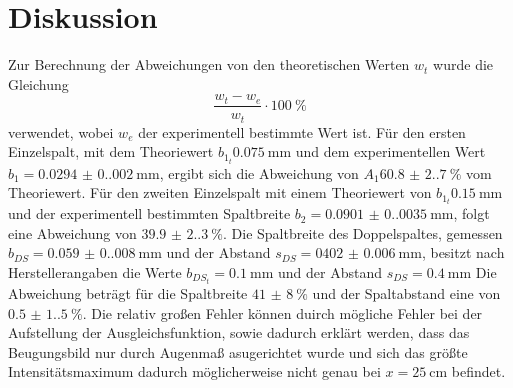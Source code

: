 \section{Diskussion}

Zur Berechnung der Abweichungen von den theoretischen Werten $w_t$ wurde die Gleichung 
\begin{equation}
    \frac{w_t-w_e}{w_t}\cdot \qty{100}{\percent}
    \label{eqn:ABweichung}
\end{equation}
\noindent verwendet, 
wobei $w_e$ der experimentell bestimmte Wert ist. Für den ersten Einzelspalt, mit dem Theoriewert $b_{1_t}\qty{0.075}{\milli\meter}$
und dem experimentellen Wert $b_1=\qty{0.0294(0.0020)}{\milli\meter}$, ergibt sich die Abweichung von $A_1\qty{60.8(2.7)}{\percent}$ vom Theoriewert. 
Für den zweiten Einzelspalt mit einem Theoriewert von $b_{1_t}\qty{0.15}{\milli\meter}$ und der experimentell bestimmten Spaltbreite $b_2=\qty{0.0901(0.0035)}{\milli\meter}$, folgt eine Abweichung von $\qty{39.9(2.3)}{\percent}$.
Die Spaltbreite des Doppelspaltes, gemessen $b_{DS}=\qty{0.059(0.008)}{\milli\meter}$ und der Abstand $s_{DS}=\qty{0402(0.006)}{\milli\meter}$, 
besitzt nach Herstellerangaben die Werte $b_{DS_t}=\qty{0.1}{\milli\meter}$ und der Abstand $s_{DS}=\qty{0.4}{\milli\meter}$
Die Abweichung beträgt für die Spaltbreite $\qty{41(8)}{\percent}$ und der Spaltabstand eine von $\qty{0.5(1.5)}{\percent}$.
Die relativ großen Fehler können duirch mögliche Fehler bei der Aufstellung der Ausgleichsfunktion, sowie dadurch erklärt werden, dass das Beugungsbild nur durch Augenmaß asugerichtet
wurde und sich das größte Intensitätsmaximum dadurch möglicherweise nicht genau bei $x=\qty{25}{\centi\meter}$ befindet.

\label{sec:Diskussion}
